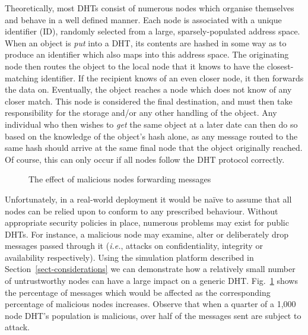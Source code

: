 \documentclass{elsart3p}
\begin{document}
Theoretically, most DHTs consist of numerous nodes which organise
themselves and behave in a well defined manner. Each node is
associated with a unique identifier (ID), randomly selected from a
large, sparsely-populated address space. When an object is
\emph{put} into a DHT, its contents are hashed in some way as to
produce an identifier which also maps into this address space. The
originating node then routes the object to the local node that it
knows to have the closest-matching identifier. If the recipient
knows of an even closer node, it then forwards the data on.
Eventually, the object reaches a node which does not know of any
closer match. This node is considered the final destination, and
must then take responsibility for the storage and/or any other
handling of the object. Any individual who then wishes to \emph{get}
the same object at a later date can then do so based on the
knowledge of the object's hash alone, as any message routed to the
same hash should arrive at the same final node that the object originally
reached. Of course, this can only occur if all nodes follow the DHT
protocol correctly.



\begin{figure}[tb]
\centering
{}
\caption{The effect of malicious nodes forwarding messages}
\label{fig:tamper}
\end{figure}

Unfortunately, in a real-world deployment it would be na\"ive to
assume that all nodes can be relied upon to conform to any
prescribed behaviour. Without appropriate security policies in
place, numerous problems may exist for public DHTs. For instance, a
malicious node may examine, alter or deliberately drop messages
passed through it (\emph{i.e.}, attacks on confidentiality,
integrity or availability respectively). Using the simulation
platform described in Section~\ref{sect-considerations} we can
demonstrate how a relatively small number of untrustworthy nodes can
have a large impact on a generic DHT. Fig.~\ref{fig:tamper} shows
the percentage of messages which would be affected as the
corresponding percentage of malicious nodes increases. Observe that
when a quarter of a 1,000 node DHT's population is malicious, over
half of the messages sent are subject to attack.
\end{document}
